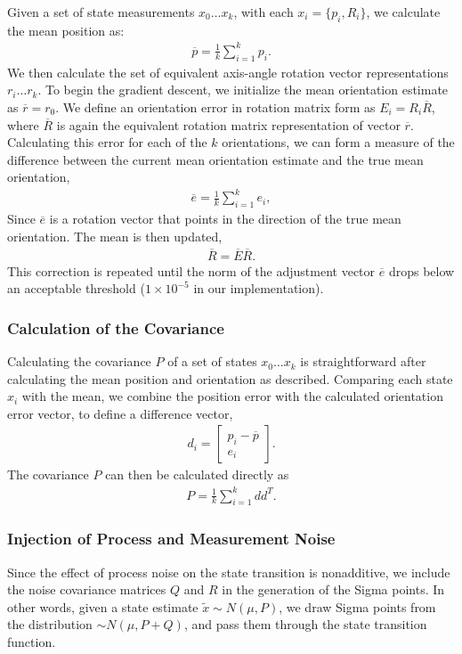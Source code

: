 Given a set of state measurements $x_0 \dots x_k$, with each $x_i = \{p_i,R_i\}$, we calculate the mean position as:
\begin{align}
\overline{p} = \frac{1}{k}\sum\limits_{i=1}^{k} p_i.
\end{align}
We then calculate the set of equivalent axis-angle rotation vector representations $r_i \dots r_k$. To begin the gradient descent, we initialize the mean orientation estimate as $\overline{r} = r_0$. We define an orientation error in rotation matrix form as $E_i = R_i\overline{R}$, where $\overline{R}$ is again the equivalent rotation matrix representation of vector $\overline{r}$. Calculating this error for each of the $k$ orientations, we can form a measure of the difference between the current mean orientation estimate and the true mean orientation,
\begin{align}
\overline{e} = \frac{1}{k}\sum\limits_{i=1}^{k} e_i,
\end{align}
Since $\overline{e}$ is a rotation vector that points in the direction of the true mean orientation. The mean is then updated,
\begin{align}
\overline{R} = \overline{E} \overline{R}.
\end{align}
This correction is repeated until the norm of the adjustment vector $\overline{e}$ drops below an acceptable threshold ($1\times10^{-5}$ in our implementation).

\subsubsection{Calculation of the Covariance}
Calculating the covariance $P$ of a set of states $x_0 \dots x_k$ is straightforward after calculating the mean position and orientation as described. Comparing each state $x_i$ with the mean, we combine the position error with the calculated orientation error vector, to define a difference vector,
\begin{align}
d_i = \begin{bmatrix} p_i - \overline{p}\\ 
e_i
\end{bmatrix}.
\end{align}
The covariance $P$ can then be calculated directly as
\begin{align}
P = \frac{1}{k}\sum\limits_{i=1}^{k}dd^T.
\end{align}

\subsubsection{Injection of Process and Measurement Noise}
Since the effect of process noise on the state transition is nonadditive, we include the noise covariance matrices $Q$ and $R$ in the generation of the Sigma points. In other words, given a state estimate $\tilde{x} \sim N\left(\mu,P\right)$, we draw Sigma points from the distribution $\sim N\left(\mu,P+Q\right)$, and pass them through the state transition function.
 

